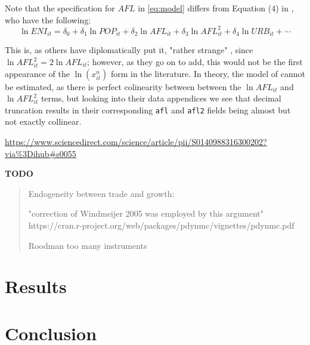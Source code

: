 \documentclass[12pt,a4paper]{article}
\begin{document}
Note that the specification for $AFL$ in \cref{eq:model} differs from Equation (4) in \cite{rafiqUrbanizationOpennessEmissions2016}, who have the following:
\begin{equation*}\label{eq:rafiqmodel}
\ln ENI_{it} = \delta_0 + \delta_1 \ln POP_{it} + \delta_2 \ln AFL_{it} + \delta_3 \ln AFL_{it}^2 + \delta_4 \ln URB_{it} + \cdots
\end{equation*}

This is, as others have diplomatically put it, "rather strange" \cite[p. 4936]{moosaEconometricsEnvironmentalKuznets2017}, since $\ln AFL_{it}^2 = 2 \ln AFL_{it}$; however, as they go on to add, this would not be the first appearance of the $\ln \left( x^n_{it} \right)$ form in the literature.
In theory, the model of \cite{rafiqUrbanizationOpennessEmissions2016} cannot be estimated, as there is perfect colinearity between between the $\ln AFL_{it}$ and $\ln AFL_{it}^2$ terms, but looking into their data appendices\footnotemark{} we see that decimal truncation results in their corresponding \texttt{afl} and \texttt{afl2} fields being almost but not exactly collinear.

\urldef\rafiqdata\url{https://www.sciencedirect.com/science/article/pii/S0140988316300202?via%3Dihub#s0055}

\noindent\textbf{TODO}
\begin{quote}
Endogeneity between trade and growth: \cite{rodriguezTradePolicyEconomic2001}

"correction of Windmeijer 2005 was employed by this argument" https://cran.r-project.org/web/packages/pdynmc/vignettes/pdynmc.pdf

Roodman too many instruments
\end{quote}




\section{Results}\label{sec:results}

\section{Conclusion}\label{sec:conclusion}

\clearpage
\end{document}
